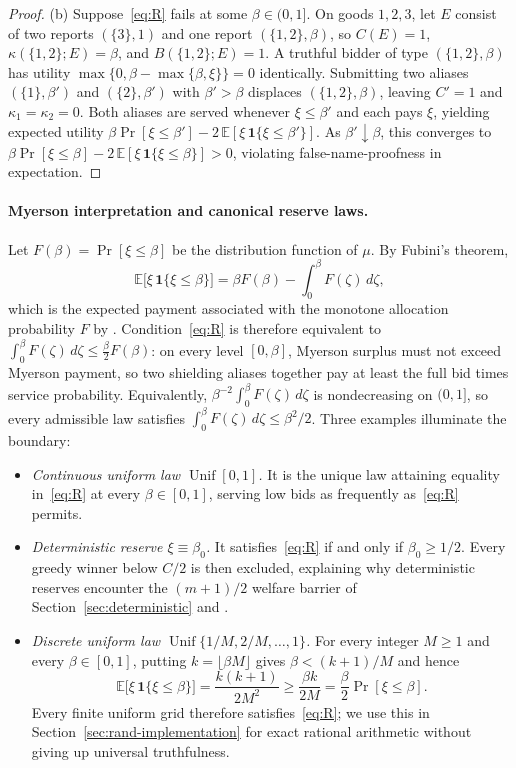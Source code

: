 \documentclass[format=acmsmall, review=false]{acmart}
\newcommand{\E}{\mathbb{E}}
\theoremstyle{acmdefinition}%
\begin{document}
\begin{proof}
(b) Suppose~\eqref{eq:R} fails at some \(\beta\in(0,1]\). On goods
\(1,2,3\), let \(E\) consist of two reports \((\{3\},1)\) and one
report \((\{1,2\},\beta)\), so \(C(E)=1\),
\(\kappa(\{1,2\};E)=\beta\), and \(B(\{1,2\};E)=1\). A truthful
bidder of type \((\{1,2\},\beta)\) has utility
\(\max\{0,\beta-\max\{\beta,\xi\}\}=0\) identically. Submitting
two aliases \((\{1\},\beta')\) and \((\{2\},\beta')\) with
\(\beta'>\beta\) displaces \((\{1,2\},\beta)\), leaving \(C'=1\)
and \(\kappa_1=\kappa_2=0\). Both aliases are served whenever
\(\xi\le\beta'\) and each pays \(\xi\), yielding expected utility
\(\beta\Pr[\xi\le\beta']-2\,\E[\xi\,\mathbf{1}\{\xi\le\beta'\}]\).
As \(\beta'\downarrow\beta\), this converges to
\(\beta\Pr[\xi\le\beta]-2\,\E[\xi\,\mathbf{1}\{\xi\le\beta\}]>0\),
violating false-name-proofness in expectation.
\end{proof}

\paragraph{Myerson interpretation and canonical reserve laws.}
Let \(F(\beta)=\Pr[\xi\le\beta]\) be the distribution function of
\(\mu\). By Fubini's theorem,
\[
\E\bigl[\xi\,\mathbf{1}\{\xi\le\beta\}\bigr]
=\beta F(\beta)-\int_0^\beta F(\zeta)\,d\zeta,
\]
which is the expected payment associated with the monotone
allocation probability \(F\) by \citet{myerson1981optimal}.
Condition~\eqref{eq:R} is therefore equivalent to
\(\int_0^\beta F(\zeta)\,d\zeta\le\frac{\beta}{2}F(\beta)\): on
every level \([0,\beta]\), Myerson surplus must not exceed Myerson
payment, so two shielding aliases together pay at least the full
bid times service probability. Equivalently,
\(\beta^{-2}\int_0^\beta F(\zeta)\,d\zeta\) is nondecreasing on
\((0,1]\), so every admissible law satisfies
\(\int_0^\beta F(\zeta)\,d\zeta\le\beta^2/2\). Three examples
illuminate the boundary:
\begin{itemize}
\item \emph{Continuous uniform law \(\operatorname{Unif}[0,1]\).}
It is the unique law attaining equality in~\eqref{eq:R} at every
\(\beta\in[0,1]\), serving low bids as frequently as~\eqref{eq:R}
permits.
\item \emph{Deterministic reserve \(\xi\equiv\beta_0\).}
It satisfies~\eqref{eq:R} if and only if \(\beta_0\ge1/2\). Every
greedy winner below \(C/2\) is then excluded, explaining why
deterministic reserves encounter the \((m+1)/2\) welfare barrier
of Section~\ref{sec:deterministic} and \citet{iwasaki2010worst}.
\item \emph{Discrete uniform law \(\operatorname{Unif}\{1/M,2/M,\ldots,1\}\).}
For every integer \(M\ge1\) and every \(\beta\in[0,1]\), putting
\(k=\lfloor\beta M\rfloor\) gives \(\beta<(k+1)/M\) and hence
\[
\E\bigl[\xi\,\mathbf{1}\{\xi\le\beta\}\bigr]
=\frac{k(k+1)}{2M^2}
\ge\frac{\beta k}{2M}
=\frac{\beta}{2}\Pr[\xi\le\beta].
\]
Every finite uniform grid therefore satisfies~\eqref{eq:R}; we use
this in Section~\ref{sec:rand-implementation} for exact rational
arithmetic without giving up universal truthfulness.
\end{itemize}
\end{document}
